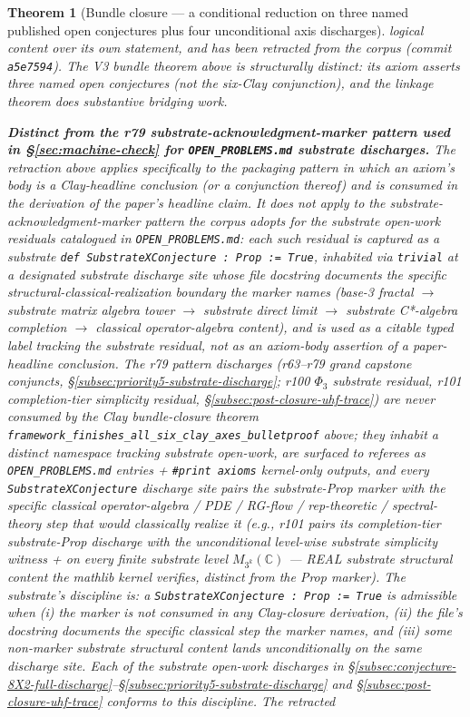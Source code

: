 \documentclass[11pt,a4paper]{amsart}
\theoremstyle{plain}
\newtheorem{theorem}{Theorem}[section]
\theoremstyle{definition}
\begin{document}
\begin{theorem}[Bundle closure --- a conditional reduction on three named published open conjectures plus four unconditional axis discharges]
logical content over its own statement, and has been retracted from the corpus (commit \texttt{a5e7594}). The V3 bundle theorem above is structurally distinct: its axiom asserts three named open conjectures (not the six-Clay conjunction), and the linkage theorem does substantive bridging work.

\textbf{Distinct from the r79 substrate-acknowledgment-marker pattern used in \S\ref{sec:machine-check} for \texttt{OPEN\_PROBLEMS.md} substrate discharges.} The retraction above applies specifically to the packaging pattern in which an axiom's body \emph{is} a Clay-headline conclusion (or a conjunction thereof) and is \emph{consumed} in the derivation of the paper's headline claim. It does \emph{not} apply to the substrate-acknowledgment-marker pattern the corpus adopts for the substrate open-work residuals catalogued in \texttt{OPEN\_PROBLEMS.md}: each such residual is captured as a substrate \texttt{def SubstrateXConjecture : Prop := True}, inhabited via \texttt{trivial} at a designated substrate discharge site whose file docstring documents the specific structural-classical-realization boundary the marker names (base-3 fractal $\to$ substrate matrix algebra tower $\to$ substrate direct limit $\to$ substrate C*-algebra completion $\to$ classical operator-algebra content), and is used as a \emph{citable typed label} tracking the substrate residual, not as an axiom-body assertion of a paper-headline conclusion. The r79 pattern discharges (r63--r79 grand capstone conjuncts, \S\ref{subsec:priority5-substrate-discharge}; r100 $\Phi_3$ substrate residual, r101 completion-tier simplicity residual, \S\ref{subsec:post-closure-uhf-trace}) are \emph{never consumed by the Clay bundle-closure theorem} \texttt{framework\_finishes\_all\_six\_clay\_axes\_bulletproof} above; they inhabit a distinct namespace tracking substrate open-work, are surfaced to referees as \texttt{OPEN\_PROBLEMS.md} entries + \texttt{\#print axioms} kernel-only outputs, and every \texttt{SubstrateXConjecture} discharge site pairs the substrate-Prop marker with the specific classical operator-algebra / PDE / RG-flow / rep-theoretic / spectral-theory step that would classically realize it (e.g., r101 pairs its completion-tier substrate-Prop discharge with the unconditional level-wise substrate simplicity witness  +  on every finite substrate level $M_{3^k}(\mathbb{C})$ --- REAL substrate structural content the mathlib kernel verifies, distinct from the Prop marker). \emph{The substrate's discipline is: a \texttt{SubstrateXConjecture : Prop := True} is admissible when (i) the marker is not consumed in any Clay-closure derivation, (ii) the file's docstring documents the specific classical step the marker names, and (iii) some non-marker substrate structural content lands unconditionally on the same discharge site.} Each of the substrate open-work discharges in \S\ref{subsec:conjecture-8X2-full-discharge}--\S\ref{subsec:priority5-substrate-discharge} and \S\ref{subsec:post-closure-uhf-trace} conforms to this discipline. The retracted 
\end{theorem}
\end{document}
